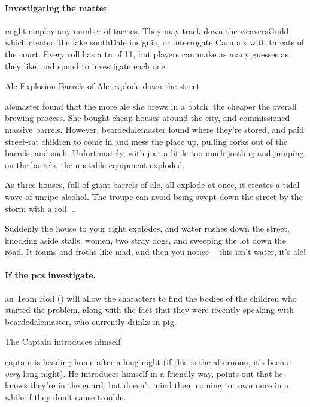 \paragraph{Investigating the matter}
might employ any number of tactics.
They may track down the \gls{weaversGuild} which created the fake \gls{southDale} insignia, or interrogate Carnpox with threats of the \gls{court}.
Every roll has a \gls{tn} of 11, but players can make as many guesses as they like, and spend  to investigate each one.

{Ale Explosion}%
{Barrels of Ale explode down the street}%

\Gls{alemaster} found that the more ale she brews in a batch, the cheaper the overall brewing process.
She bought cheap houses around the city, and commissioned massive barrels.
However, \gls{beardedalemaster} found where they're stored, and paid street-rat children to come in and mess the place up, pulling corks out of the barrels, and such.
Unfortunately, with just a little too much jostling and jumping on the barrels, the unstable equipment exploded.

As three houses, full of giant barrels of ale, all explode at once, it creates a tidal wave of unripe alcohol.
The troupe can avoid being swept down the street by the storm with a  roll, \tn[8].

\begin{boxtext}
  Suddenly the house to your right explodes, and water rushes down the street, knocking aside stalls, women, two stray dogs, and sweeping the lot down the road.  It foams and froths like mad, and then you notice -- this isn't water, it's ale!
\end{boxtext}

\paragraph{If the \glspl{pc} investigate,}
an  Team Roll (\tn[10]) will allow the characters to find the bodies of the children who started the problem, along with the fact that they were recently speaking with \gls{beardedalemaster}, who currently drinks in \gls{pig}.%
\iftoggle{core}%
{\footnote{See the Core Rules, \autopageref{teamwork}, for Team Rolls.}}%
{}%

{\squash The Captain}%
{ introduces himself}%

\Gls{captain} is heading home after a long night (if this is the afternoon, it's been a \emph{very} long night).
He introduces himself in a friendly way, points out that he knows they're in the \gls{guard}, but doesn't mind them coming to town once in a while if they don't cause trouble.

